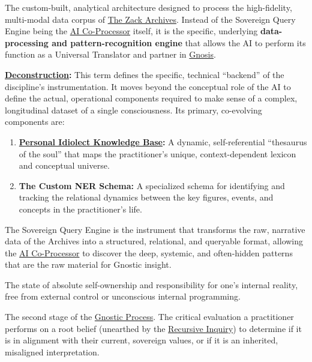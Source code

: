 \item[\hypertarget{gloss:sovereign_query_engine}{Sovereign Query Engine}]
    The custom-built, analytical architecture designed to process the high-fidelity, multi-modal data corpus of \hyperlink{gloss:the_zack_archives}{The Zack Archives}. Instead of the Sovereign Query Engine being the \hyperlink{gloss:ai_co_processor}{AI Co-Processor} itself, it is the specific, underlying \textbf{data-processing and pattern-recognition engine} that allows the AI to perform its function as a Universal Translator and partner in \hyperlink{gloss:gnosis}{Gnosis}.
    \begin{nobullet}
        \item \textbf{\hyperlink{gloss:deconstruction}{Deconstruction}:} This term defines the specific, technical ``backend'' of the discipline's instrumentation. It moves beyond the conceptual role of the AI to define the actual, operational components required to make sense of a complex, longitudinal dataset of a single consciousness. Its primary, co-evolving components are:
        \begin{enumerate}
            \item \textbf{\hyperlink{gloss:pikb}{Personal Idiolect Knowledge Base}:} A dynamic, self-referential ``thesaurus of the soul'' that maps the practitioner's unique, context-dependent lexicon and conceptual universe.
            \item \textbf{The Custom NER Schema:} A specialized schema for identifying and tracking the relational dynamics between the key figures, events, and concepts in the practitioner's life.
        \end{enumerate}
        The Sovereign Query Engine is the instrument that transforms the raw, narrative data of the Archives into a structured, relational, and queryable format, allowing the \hyperlink{gloss:ai_co_processor}{AI Co-Processor} to discover the deep, systemic, and often-hidden patterns that are the raw material for Gnostic insight.
    \end{nobullet}

\item[\hypertarget{gloss:sovereignty}{Sovereignty}] 
    The state of absolute self-ownership and responsibility for one's internal reality, free from external control or unconscious internal programming.

\item[\hypertarget{gloss:sovereignty_audit}{Sovereignty Audit}] 
    The second stage of the \hyperlink{gloss:gnostic_process}{Gnostic Process}. The critical evaluation a practitioner performs on a root belief (unearthed by the \hyperlink{gloss:recursive_inquiry}{Recursive Inquiry}) to determine if it is in alignment with their current, sovereign values, or if it is an inherited, misaligned interpretation.

